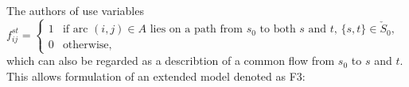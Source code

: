 The authors of \cite{Polzin} use variables
\newline\newline
$f^{st}_{ij}=
\begin{cases}
    1 & \text{if arc $(i,j) \in A$ lies on a path  from $s_0$ to both $s$ and $t$, $\{s,t\}\in \check{S}_0$},\\
    0 & \text{otherwise},
\end{cases}$
\newline\newline
which can also be regarded as a describtion of a common flow from $s_0$ to $s$ and $t$.
%
%
This allows formulation of an extended model denoted as F3: 
